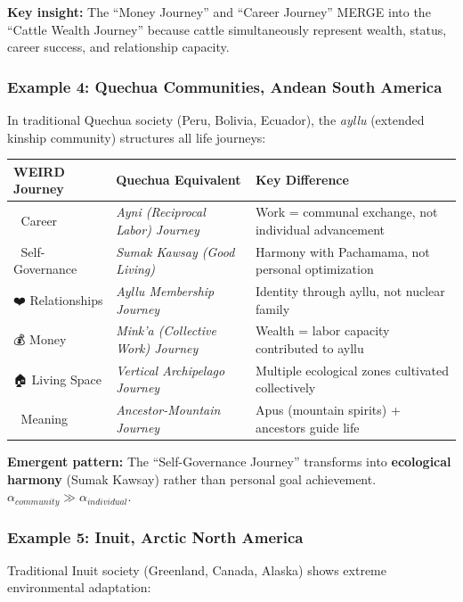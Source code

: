 {{{\textbf{Key insight:} The ``Money Journey'' and ``Career Journey'' MERGE into the ``Cattle Wealth Journey'' because cattle simultaneously represent wealth, status, career success, and relationship capacity.

\subsubsection{Example 4: Quechua Communities, Andean South America}

In traditional Quechua society (Peru, Bolivia, Ecuador), the \textit{ayllu} (extended kinship community) structures all life journeys:

\begin{center}
\small
\begin{tabular}{@{}lll@{}}
\toprule
\textbf{WEIRD Journey} & \textbf{Quechua Equivalent} & \textbf{Key Difference} \\
\midrule
💼 Career & \textit{Ayni (Reciprocal Labor) Journey} & Work = communal exchange, not individual advancement \\
🧠 Self-Governance & \textit{Sumak Kawsay (Good Living)} & Harmony with Pachamama, not personal optimization \\
❤️ Relationships & \textit{Ayllu Membership Journey} & Identity through ayllu, not nuclear family \\
💰 Money & \textit{Mink'a (Collective Work) Journey} & Wealth = labor capacity contributed to ayllu \\
🏠 Living Space & \textit{Vertical Archipelago Journey} & Multiple ecological zones cultivated collectively \\
🧭 Meaning & \textit{Ancestor-Mountain Journey} & Apus (mountain spirits) + ancestors guide life \\
\bottomrule
\end{tabular}
\end{center}

\textbf{Emergent pattern:} The ``Self-Governance Journey'' transforms into \textbf{ecological harmony} (Sumak Kawsay) rather than personal goal achievement. $\alpha_{community} \gg \alpha_{individual}$.

\subsubsection{Example 5: Inuit, Arctic North America}

Traditional Inuit society (Greenland, Canada, Alaska) shows extreme environmental adaptation:

}}}
